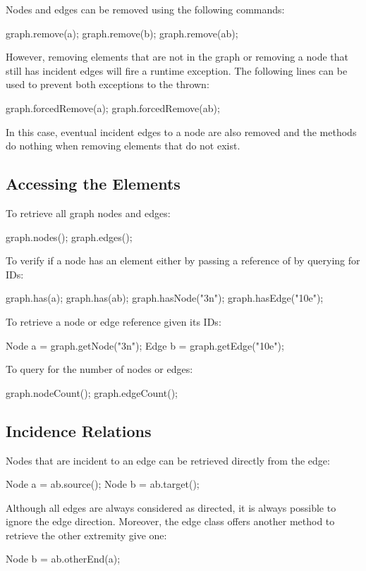 Nodes and edges can be removed using the following commands:
\begin{java}
graph.remove(a);
graph.remove(b);
graph.remove(ab);
\end{java}
However, removing elements that are not in the graph or removing a node that still has incident edges will fire a runtime exception. The following lines can be used to prevent both exceptions to the thrown:
\begin{java}
graph.forcedRemove(a);
graph.forcedRemove(ab);
\end{java}
In this case, eventual incident edges to a node are also removed and the methods do nothing when removing elements that do not exist.


\subsection{Accessing the Elements}
To retrieve all graph nodes and edges:
\begin{java}
graph.nodes();
graph.edges();
\end{java}
To verify if a node has an element either by passing a reference of by querying for IDs:
\begin{java}
graph.has(a);
graph.has(ab);
graph.hasNode("3n");
graph.hasEdge("10e");
\end{java}
To retrieve a node or edge reference given its IDs:
\begin{java}
Node a = graph.getNode("3n");
Edge b = graph.getEdge("10e");
\end{java}
To query for the number of nodes or edges:
\begin{java}
graph.nodeCount();
graph.edgeCount();
\end{java}


\subsection{Incidence Relations}
Nodes that are incident to an edge can be retrieved directly from the edge:
\begin{java}
Node a = ab.source();
Node b = ab.target();
\end{java}
Although all edges are always considered as directed, it is always possible to ignore the edge direction. Moreover, the edge class offers another method to retrieve the other extremity give one:
\begin{java}
Node b = ab.otherEnd(a);
\end{java}


